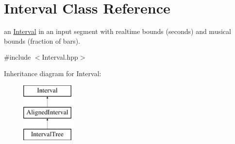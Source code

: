 \hypertarget{classInterval}{}\section{Interval Class Reference}
\label{classInterval}


an \mbox{\hyperlink{classInterval}{Interval}} in an input segment with realtime bounds (seconds) and musical bounds (fraction of bars).  




{\ttfamily \#include $<$Interval.\+hpp$>$}

Inheritance diagram for Interval\+:\begin{figure}[H]
\begin{center}
\leavevmode
\includegraphics[height=3.000000cm]{classInterval}
\end{center}
\end{figure}
